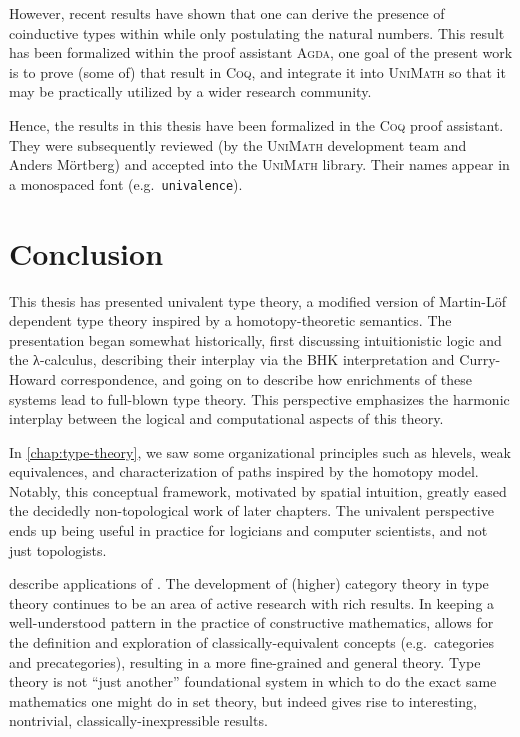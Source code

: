 \documentclass[12pt,twoside]{reedthesis}
\let\oldindex\index
\renewcommand{\index}[1]
               {\oldindex{#1}\marginpar{\footnotesize\color{index}index: #1}}
\newcommand{\indeX}{\oldindex}
\newcommand{\indeX}{\index}
\newcommand{\software}[1]{{\textsc{#1}}\indeX{#1}}
\newcommand{\Agda}{\software{Agda}}
\newcommand{\UniMath}{\software{UniMath}}
\newcommand{\Coq}{\software{Coq}}
\newcommand{\unimathname}[1]{\texttt{#1}}
\begin{document}
However, recent results have shown that one can derive the presence of
coinductive types within \UTT{} while only postulating the natural numbers.
This result has been formalized within the proof assistant \Agda{}, one goal of
the present work is to prove (some of) that result in \Coq{}, and integrate it
into \UniMath{} so that it may be practically utilized by a wider research
community. 

Hence, the results in this thesis have been formalized in the \Coq{} proof
assistant. They were subsequently reviewed (by the \UniMath{}
development team \cite{unimath} and Anders Mörtberg) and accepted into the
\UniMath{} library. Their names appear in a monospaced font (e.g.\
\unimathname{univalence}). 






\chapter*{Conclusion}
\setcounter{chapter}{5}
\setcounter{section}{0}

This thesis has presented univalent type theory, a modified version of Martin-Löf
dependent type theory inspired by a homotopy-theoretic semantics. The
presentation began somewhat historically, first discussing intuitionistic
logic and the λ-calculus, describing their interplay via the BHK interpretation
and Curry-Howard correspondence, and going on to describe how enrichments of
these systems lead to full-blown type theory. This perspective emphasizes
the harmonic interplay between the logical and computational aspects of this
theory. 

In \cref{chap:type-theory}, we saw some organizational principles such as
hlevels, weak equivalences, and characterization of paths inspired by the
homotopy model. Notably, this conceptual framework, motivated by spatial
intuition, greatly eased the decidedly non-topological work of later chapters. 
The univalent perspective ends up being useful in practice for logicians and
computer scientists, and not just topologists.

describe applications of \UTT{}. The development of (higher) category theory in
type theory continues to be an area of active research with rich results.
In keeping a well-understood pattern in the practice of constructive mathematics,
\UTT{} allows for the definition and exploration of classically-equivalent
concepts (e.g.\ categories and precategories), resulting in a more fine-grained
and general theory. Type theory is not ``just another'' foundational system in
which to do the exact same mathematics one might do in set theory, but indeed
gives rise to interesting, nontrivial, classically-inexpressible results.
\end{document}
